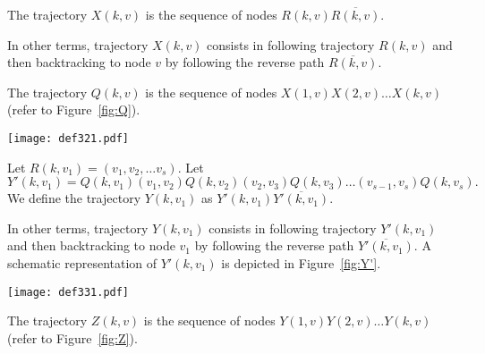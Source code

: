 \documentclass [11pt] {article}
\begin{document}
\begin{definition}
The trajectory $X(k,v)$ is the sequence of nodes  $R(k,v)\overline{R(k,v)}$.
\end{definition}

{In other terms, trajectory $X(k,v)$ consists in following trajectory $R(k,v)$ and then backtracking to node $v$ by following the reverse path $\overline{R(k,v)}$}.

\begin{definition}
\label{def:Q}
The trajectory $Q(k,v)$ is the sequence of nodes $X(1,v)X(2,v)\dots X(k,v)$ {(refer to Figure~\ref{fig:Q})}.
\end{definition}

\begin{figure*}[httb!]
	\begin{center}
	\texttt{[image: def321.pdf]}
	\caption{{A schematic representation of trajectory $Q(k,v)$ which is made up of a sequence of consecutive trajectories $X(i,v)$ from $i=1$ to $i=k$.}}
	\label{fig:Q}
	\end{center}
\end{figure*}

\begin{definition}
\label{def:Y}
Let $R(k,v_1)=(v_1,v_2,\dots v_s)$. Let $$Y'(k,v_1)=Q(k,v_1)(v_1,v_2)Q(k,v_2)(v_2,v_3)Q(k,v_3)\dots (v_{s-1},v_s) Q(k,v_s).$$ We define
the trajectory $Y(k,v_1)$ as $Y'(k,v_1)\overline{Y'(k,v_1)}$. 
\end{definition}

{In other terms, trajectory $Y(k,v_1)$ consists in following trajectory $Y'(k,v_1)$ and then backtracking to node $v_1$ by following the reverse path $\overline{Y'(k,v_1)}$. A schematic representation of $Y'(k,v_1)$ is depicted in Figure~\ref{fig:Y'}.}

\begin{figure*}[httb!]
	\begin{center}
	\texttt{[image: def331.pdf]}
	\caption{{A schematic representation of trajectory $Y'(k,v_1)$ which consists in following trajectory $R(k,v_1)=(v_1,v_2,\dots v_s)$ with the following insertions: for all $i<s$, before going from node $v_i$ to $v_{i+1}$ the agent follows trajectory $Q(k,v_i)$.}}
	\label{fig:Y'}
	\end{center}
\end{figure*}

\begin{definition}
\label{def:Z}
The trajectory $Z(k,v)$ is the sequence of nodes $Y(1,v)Y(2,v)\dots Y(k,v)$ {(refer to Figure~\ref{fig:Z})}.
\end{definition}
\end{document}
